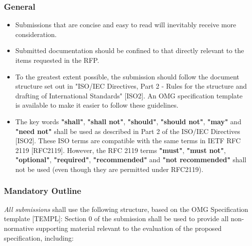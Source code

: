 \subsubsection{General}

\begin{itemize}
\item    Submissions that are concise and easy to read will inevitably receive more consideration.
\item    Submitted documentation should be confined to that directly relevant to the items requested in the RFP.
\item    To the greatest extent possible, the submission should follow the document structure set out in "ISO/IEC Directives, Part 2 - Rules for the structure and drafting of International Standards" [ISO2]. An OMG specification template is available to make it easier to follow these guidelines.
\item    The key words \textbf{"shall"}, \textbf{"shall not"}, \textbf{"should"}, \textbf{"should not"}, \textbf{"may"} and \textbf{"need not"} shall be used as described in Part 2 of the ISO/IEC Directives [ISO2]. These ISO terms are compatible with the same terms in IETF RFC 2119 [RFC2119]. However, the RFC 2119 terms \textbf{"must"}, \textbf{"must not"}, \textbf{"optional"}, \textbf{"required"}, \textbf{"recommended"} and \textbf{"not recommended"} shall not be used (even though they are permitted under RFC2119).
\end{itemize}


\subsubsection{Mandatory Outline}

\textit{All submissions} shall use the following structure, based on the OMG Specification template [TEMPL]:
Section 0 of the submission shall be used to provide all non-normative supporting material relevant to the evaluation of the proposed specification, including:

